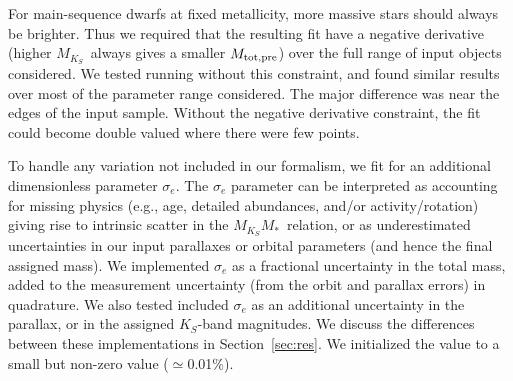 \documentclass[twocolumn]{aastex62}
\newcommand{\mks}{$M_{K_S}$}
\newcommand{\mmk}{$M_{K_S}$\textendash$M_*$}
\newcommand{\mpred}{$M_{\rm{tot,pre}}$}
\begin{document}
For main-sequence dwarfs at fixed metallicity, more massive stars should always be brighter. Thus we required that the resulting fit have a negative derivative (higher \mks\ always gives a smaller \mpred) over the full range of input objects considered. We tested running without this constraint, and found similar results over most of the parameter range considered. The major difference was near the edges of the input sample. Without the negative derivative constraint, the fit could become double valued where there were few points.

To handle any variation not included in our formalism, we fit for an additional dimensionless parameter $\sigma_e$. The $\sigma_e$ parameter can be interpreted as accounting for missing physics (e.g., age, detailed abundances, and/or activity/rotation) giving rise to intrinsic scatter in the \mmk\ relation, or as underestimated uncertainties in our input parallaxes or orbital parameters (and hence the final assigned mass). We implemented $\sigma_e$ as a fractional uncertainty in the total mass, added to the measurement uncertainty (from the orbit and parallax errors) in quadrature. We also tested included $\sigma_e$ as an additional uncertainty in the parallax, or in the assigned $K_S$-band magnitudes. We discuss the differences between these implementations in Section~\ref{sec:res}. We initialized the value to a small but non-zero value ($\simeq$0.01\%).
\end{document}
